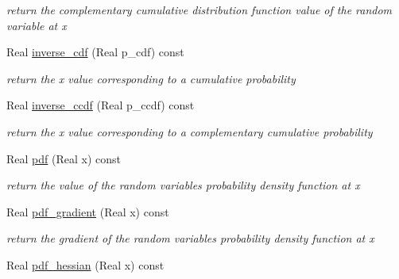 \begin{DoxyCompactItemize}
\begin{DoxyCompactList}\small\item\em return the complementary cumulative distribution function value of the random variable at x \end{DoxyCompactList}\item 
Real \hyperlink{classPecos_1_1TriangularRandomVariable_a918a1aac05ca349ea5313eebcba46c3e}{inverse\+\_\+cdf} (Real p\+\_\+cdf) const \label{classPecos_1_1TriangularRandomVariable_a918a1aac05ca349ea5313eebcba46c3e}

\begin{DoxyCompactList}\small\item\em return the x value corresponding to a cumulative probability \end{DoxyCompactList}\item 
Real \hyperlink{classPecos_1_1TriangularRandomVariable_afda003a1f59ff6930902cd5c8601f49b}{inverse\+\_\+ccdf} (Real p\+\_\+ccdf) const \label{classPecos_1_1TriangularRandomVariable_afda003a1f59ff6930902cd5c8601f49b}

\begin{DoxyCompactList}\small\item\em return the x value corresponding to a complementary cumulative probability \end{DoxyCompactList}\item 
Real \hyperlink{classPecos_1_1TriangularRandomVariable_a8ec69265f428e17c1707133cb137a819}{pdf} (Real x) const \label{classPecos_1_1TriangularRandomVariable_a8ec69265f428e17c1707133cb137a819}

\begin{DoxyCompactList}\small\item\em return the value of the random variable\textquotesingle{}s probability density function at x \end{DoxyCompactList}\item 
Real \hyperlink{classPecos_1_1TriangularRandomVariable_aaa7ca3718abc034be7629af5594efca0}{pdf\+\_\+gradient} (Real x) const \label{classPecos_1_1TriangularRandomVariable_aaa7ca3718abc034be7629af5594efca0}

\begin{DoxyCompactList}\small\item\em return the gradient of the random variable\textquotesingle{}s probability density function at x \end{DoxyCompactList}\item 
Real \hyperlink{classPecos_1_1TriangularRandomVariable_a514a0abe97269ac6e003f43683d9137e}{pdf\+\_\+hessian} (Real x) const \label{classPecos_1_1TriangularRandomVariable_a514a0abe97269ac6e003f43683d9137e}


\end{DoxyCompactItemize}
